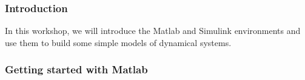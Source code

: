 \documentclass[9pt]{beamer-control}
\begin{document}

\begin{frame}
\frametitle{Introduction}
In this workshop, we will introduce the Matlab and Simulink environments and use them to build some simple models of dynamical systems.
\end{frame}


\begin{frame}[fragile]
\frametitle{Getting started with Matlab}



\end{frame}
\end{document}
